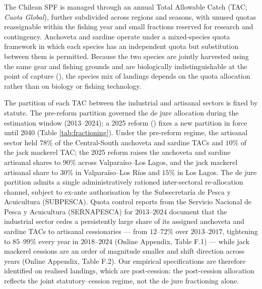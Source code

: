 \documentclass[
  11pt,
]{article}
\begin{document}
The Chilean SPF is managed through an annual Total Allowable Catch (TAC; \emph{Cuota Global}), further subdivided across regions and seasons, with unused quotas reassignable within the fishing year and small fractions reserved for research and contingency. Anchoveta and sardine operate under a mixed-species quota framework in which each species has an independent quota but substitution between them is permitted. Because the two species are jointly harvested using the same gear and fishing grounds and are biologically indistinguishable at the point of capture (), the species mix of landings depends on the quota allocation rather than on biology or fishing technology.

The partition of each TAC between the industrial and artisanal sectors is fixed by statute. The pre-reform partition governed the de jure allocation during the estimation window (2013--2024); a 2025 reform () fixes a new partition in force until 2040 (Table \ref{tab:fractioning}). Under the pre-reform regime, the artisanal sector held \(78\%\) of the Central-South anchoveta and sardine TACs and \(10\%\) of the jack mackerel TAC; the 2025 reform raises the anchoveta and sardine artisanal shares to \(90\%\) across Valparaíso--Los Lagos, and the jack mackerel artisanal share to \(30\%\) in Valparaíso--Los Ríos and \(15\%\) in Los Lagos. The de jure partition admits a single administratively rationed inter-sectoral re-allocation channel, subject to ex-ante authorisation by the Subsecretaría de Pesca y Acuicultura (SUBPESCA). Quota control reports from the Servicio Nacional de Pesca y Acuicultura (SERNAPESCA) for \(2013\)--\(2024\) document that the industrial sector cedes a persistently large share of its assigned anchoveta and sardine TACs to artisanal cessionaries --- from \(12\)--\(72\%\) over \(2013\)--\(2017\), tightening to \(85\)--\(99\%\) every year in \(2018\)--\(2024\) (Online Appendix, Table F.1) --- while jack mackerel cessions are an order of magnitude smaller and shift direction across years (Online Appendix, Table F.2). Our empirical specifications are therefore identified on realised landings, which are post-cession: the post-cession allocation reflects the joint statutory--cession regime, not the de jure fractioning alone.
\end{document}
